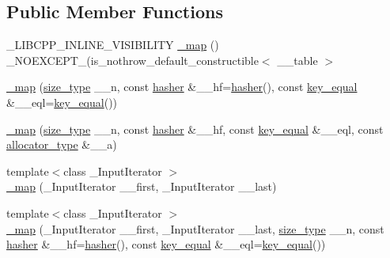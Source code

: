\subsection*{Public Member Functions}
\begin{DoxyCompactItemize}
\item 
\+\_\+\+L\+I\+B\+C\+P\+P\+\_\+\+I\+N\+L\+I\+N\+E\+\_\+\+V\+I\+S\+I\+B\+I\+L\+I\+T\+Y \hyperlink{class__map_a17a1f453f8e0edf0d2b7eccdf2d1ea94}{\+\_\+map} () \+\_\+\+N\+O\+E\+X\+C\+E\+P\+T\+\_\+(is\+\_\+nothrow\+\_\+default\+\_\+constructible$<$ \+\_\+\+\_\+table $>$
\item 
\hyperlink{class__map_a5508ef9d7f61808bfbcf817472f9aaea}{\+\_\+map} (\hyperlink{class__map_adc37f621be25fda072b12873e60e9fc7}{size\+\_\+type} \+\_\+\+\_\+n, const \hyperlink{class__map_a1ca536646126d87b3ac0b7fe3aee3534}{hasher} \&\+\_\+\+\_\+hf=\hyperlink{class__map_a1ca536646126d87b3ac0b7fe3aee3534}{hasher}(), const \hyperlink{class__map_ac341e21272b7041e034855227f1cce49}{key\+\_\+equal} \&\+\_\+\+\_\+eql=\hyperlink{class__map_ac341e21272b7041e034855227f1cce49}{key\+\_\+equal}())
\item 
\hyperlink{class__map_a475e5f7a3b66019efb2d498e6be72514}{\+\_\+map} (\hyperlink{class__map_adc37f621be25fda072b12873e60e9fc7}{size\+\_\+type} \+\_\+\+\_\+n, const \hyperlink{class__map_a1ca536646126d87b3ac0b7fe3aee3534}{hasher} \&\+\_\+\+\_\+hf, const \hyperlink{class__map_ac341e21272b7041e034855227f1cce49}{key\+\_\+equal} \&\+\_\+\+\_\+eql, const \hyperlink{class__map_ab38dd0bcf1867887afc2be61257ef025}{allocator\+\_\+type} \&\+\_\+\+\_\+a)
\item 
{\footnotesize template$<$class \+\_\+\+Input\+Iterator $>$ }\\\hyperlink{class__map_a83c8c4b10e33f323aebd39c57bc871c1}{\+\_\+map} (\+\_\+\+Input\+Iterator \+\_\+\+\_\+first, \+\_\+\+Input\+Iterator \+\_\+\+\_\+last)
\item 
{\footnotesize template$<$class \+\_\+\+Input\+Iterator $>$ }\\\hyperlink{class__map_abddb1ea6324cfb5b7ea0ed5053e19444}{\+\_\+map} (\+\_\+\+Input\+Iterator \+\_\+\+\_\+first, \+\_\+\+Input\+Iterator \+\_\+\+\_\+last, \hyperlink{class__map_adc37f621be25fda072b12873e60e9fc7}{size\+\_\+type} \+\_\+\+\_\+n, const \hyperlink{class__map_a1ca536646126d87b3ac0b7fe3aee3534}{hasher} \&\+\_\+\+\_\+hf=\hyperlink{class__map_a1ca536646126d87b3ac0b7fe3aee3534}{hasher}(), const \hyperlink{class__map_ac341e21272b7041e034855227f1cce49}{key\+\_\+equal} \&\+\_\+\+\_\+eql=\hyperlink{class__map_ac341e21272b7041e034855227f1cce49}{key\+\_\+equal}())

\end{DoxyCompactItemize}
